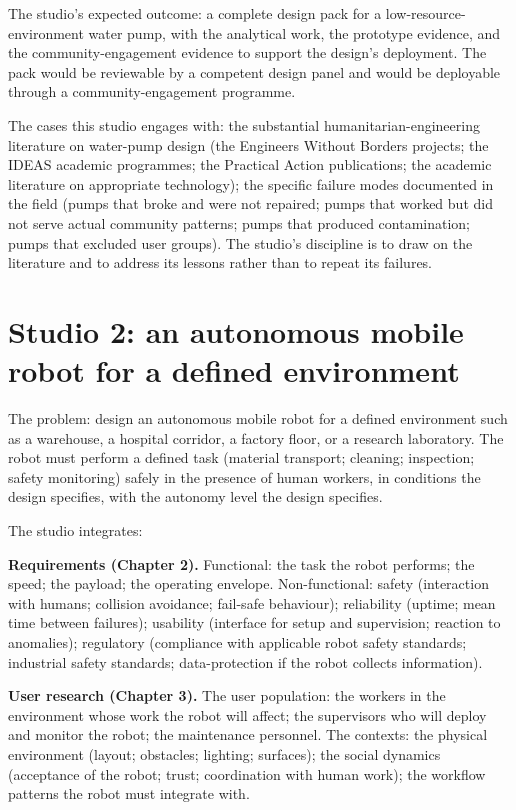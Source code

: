 The studio's expected outcome: a complete design pack for a low-resource-environment water pump, with the analytical work, the prototype evidence, and the community-engagement evidence to support the design's deployment. The pack would be reviewable by a competent design panel and would be deployable through a community-engagement programme.

The cases this studio engages with: the substantial humanitarian-engineering literature on water-pump design (the Engineers Without Borders projects; the IDEAS academic programmes; the Practical Action publications; the academic literature on appropriate technology); the specific failure modes documented in the field (pumps that broke and were not repaired; pumps that worked but did not serve actual community patterns; pumps that produced contamination; pumps that excluded user groups). The studio's discipline is to draw on the literature and to address its lessons rather than to repeat its failures.

\section{Studio 2: an autonomous mobile robot for a defined environment}

The problem: design an autonomous mobile robot for a defined environment such as a warehouse, a hospital corridor, a factory floor, or a research laboratory. The robot must perform a defined task (material transport; cleaning; inspection; safety monitoring) safely in the presence of human workers, in conditions the design specifies, with the autonomy level the design specifies.

The studio integrates:

\textbf{Requirements (Chapter 2).} Functional: the task the robot performs; the speed; the payload; the operating envelope. Non-functional: safety (interaction with humans; collision avoidance; fail-safe behaviour); reliability (uptime; mean time between failures); usability (interface for setup and supervision; reaction to anomalies); regulatory (compliance with applicable robot safety standards; industrial safety standards; data-protection if the robot collects information).

\textbf{User research (Chapter 3).} The user population: the workers in the environment whose work the robot will affect; the supervisors who will deploy and monitor the robot; the maintenance personnel. The contexts: the physical environment (layout; obstacles; lighting; surfaces); the social dynamics (acceptance of the robot; trust; coordination with human work); the workflow patterns the robot must integrate with.

